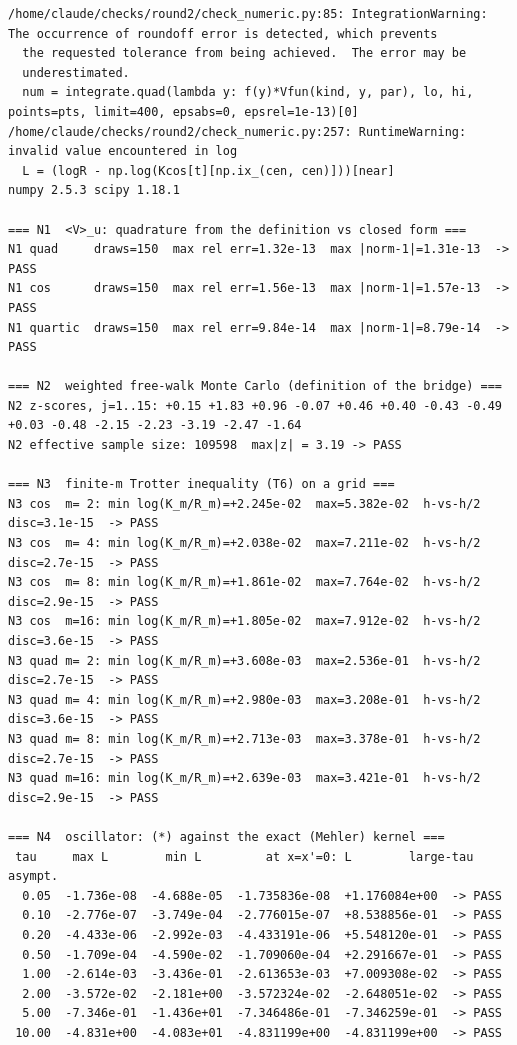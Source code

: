 \documentclass[11pt,a4paper]{article}
\begin{document}
\begin{lstlisting}
/home/claude/checks/round2/check_numeric.py:85: IntegrationWarning: The occurrence of roundoff error is detected, which prevents 
  the requested tolerance from being achieved.  The error may be 
  underestimated.
  num = integrate.quad(lambda y: f(y)*Vfun(kind, y, par), lo, hi, points=pts, limit=400, epsabs=0, epsrel=1e-13)[0]
/home/claude/checks/round2/check_numeric.py:257: RuntimeWarning: invalid value encountered in log
  L = (logR - np.log(Kcos[t][np.ix_(cen, cen)]))[near]
numpy 2.5.3 scipy 1.18.1

=== N1  <V>_u: quadrature from the definition vs closed form ===
N1 quad     draws=150  max rel err=1.32e-13  max |norm-1|=1.31e-13  -> PASS
N1 cos      draws=150  max rel err=1.56e-13  max |norm-1|=1.57e-13  -> PASS
N1 quartic  draws=150  max rel err=9.84e-14  max |norm-1|=8.79e-14  -> PASS

=== N2  weighted free-walk Monte Carlo (definition of the bridge) ===
N2 z-scores, j=1..15: +0.15 +1.83 +0.96 -0.07 +0.46 +0.40 -0.43 -0.49 +0.03 -0.48 -2.15 -2.23 -3.19 -2.47 -1.64
N2 effective sample size: 109598  max|z| = 3.19 -> PASS

=== N3  finite-m Trotter inequality (T6) on a grid ===
N3 cos  m= 2: min log(K_m/R_m)=+2.245e-02  max=5.382e-02  h-vs-h/2 disc=3.1e-15  -> PASS
N3 cos  m= 4: min log(K_m/R_m)=+2.038e-02  max=7.211e-02  h-vs-h/2 disc=2.7e-15  -> PASS
N3 cos  m= 8: min log(K_m/R_m)=+1.861e-02  max=7.764e-02  h-vs-h/2 disc=2.9e-15  -> PASS
N3 cos  m=16: min log(K_m/R_m)=+1.805e-02  max=7.912e-02  h-vs-h/2 disc=3.6e-15  -> PASS
N3 quad m= 2: min log(K_m/R_m)=+3.608e-03  max=2.536e-01  h-vs-h/2 disc=2.7e-15  -> PASS
N3 quad m= 4: min log(K_m/R_m)=+2.980e-03  max=3.208e-01  h-vs-h/2 disc=3.6e-15  -> PASS
N3 quad m= 8: min log(K_m/R_m)=+2.713e-03  max=3.378e-01  h-vs-h/2 disc=2.7e-15  -> PASS
N3 quad m=16: min log(K_m/R_m)=+2.639e-03  max=3.421e-01  h-vs-h/2 disc=2.9e-15  -> PASS

=== N4  oscillator: (*) against the exact (Mehler) kernel ===
 tau     max L        min L         at x=x'=0: L        large-tau asympt.
  0.05  -1.736e-08  -4.688e-05  -1.735836e-08  +1.176084e+00  -> PASS
  0.10  -2.776e-07  -3.749e-04  -2.776015e-07  +8.538856e-01  -> PASS
  0.20  -4.433e-06  -2.992e-03  -4.433191e-06  +5.548120e-01  -> PASS
  0.50  -1.709e-04  -4.590e-02  -1.709060e-04  +2.291667e-01  -> PASS
  1.00  -2.614e-03  -3.436e-01  -2.613653e-03  +7.009308e-02  -> PASS
  2.00  -3.572e-02  -2.181e+00  -3.572324e-02  -2.648051e-02  -> PASS
  5.00  -7.346e-01  -1.436e+01  -7.346486e-01  -7.346259e-01  -> PASS
 10.00  -4.831e+00  -4.083e+01  -4.831199e+00  -4.831199e+00  -> PASS


\end{lstlisting}
\end{document}

